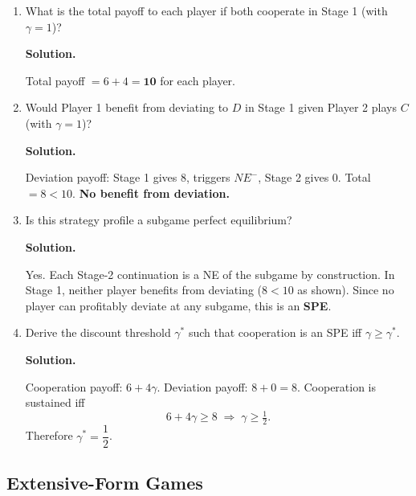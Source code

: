 \documentclass[12pt]{article}
\newenvironment{solution}{%
  \ifshowsolutions\begin{solutionbox}\noindent\textbf{\color{blue!70!black}Solution.}\quad\fi
  \ifshowsolutions\else\expandafter\comment\fi
}{%
  \ifshowsolutions\end{solutionbox}\fi
  \ifshowsolutions\else\expandafter\endcomment\fi
}
\begin{document}
\begin{enumerate}
\begin{enumerate}
  \item What is the total payoff to each player if both cooperate in Stage 1 (with $\gamma=1$)?

  \begin{solution}
    Total payoff $= 6 + 4 = \mathbf{10}$ for each player.
  \end{solution}

  \item Would Player 1 benefit from deviating to $D$ in Stage 1 given Player 2 plays $C$ (with $\gamma=1$)?

  \begin{solution}
    Deviation payoff: Stage 1 gives $8$, triggers $NE^-$, Stage 2 gives $0$. Total $=8 < 10$. \textbf{No benefit from deviation.}
  \end{solution}

  \item Is this strategy profile a subgame perfect equilibrium?

  \begin{solution}
    Yes. Each Stage-2 continuation is a NE of the subgame by construction. In Stage 1, neither player benefits from deviating ($8<10$ as shown). Since no player can profitably deviate at any subgame, this is an \textbf{SPE}.
  \end{solution}

  \item Derive the discount threshold $\gamma^*$ such that cooperation is an SPE iff $\gamma \geq \gamma^*$.

  \begin{solution}
    Cooperation payoff: $6+4\gamma$. Deviation payoff: $8 + 0 = 8$. Cooperation is sustained iff
    \[6 + 4\gamma \geq 8 \;\Rightarrow\; \gamma \geq \tfrac{1}{2}.\]
    Therefore $\gamma^* = \dfrac{1}{2}$.
  \end{solution}
\end{enumerate}

\clearpage

\subsection*{Extensive-Form Games}


\end{enumerate}
\end{document}

